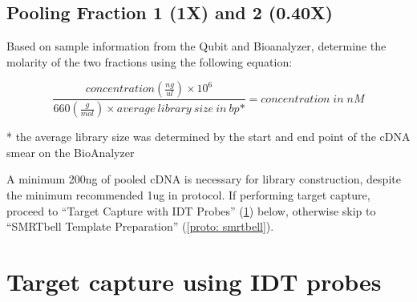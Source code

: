 \subsection{Pooling Fraction 1 (1X) and 2 (0.40X)}
Based on sample information from the Qubit and Bioanalyzer, determine the molarity of the two fractions using the following equation: 

\begin{equation}
	\frac{concentration(\frac{ng}{ul})\times 10^6}{660(\frac{g}{mol}) \times average\:library\:size\:in\:bp\mbox{*}} = concentration\;in\; nM
\end{equation}

* the average library size was determined by the start and end point of the cDNA smear on the BioAnalyzer

A minimum 200ng of pooled cDNA is necessary for library construction, despite the minimum recommended 1ug in protocol. If performing target capture, proceed to “Target Capture with IDT Probes” (\cref{proto: targetcapture}) below, otherwise skip to “SMRTbell Template Preparation” (\cref{proto: smrtbell}). 

\section{Target capture using IDT probes} 
\label{proto: targetcapture}

